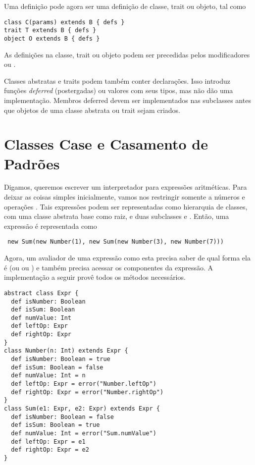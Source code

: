 Uma defini\c{c}\~{a}o pode agora ser uma defini\c{c}\~{a}o de classe, trait ou objeto, tal como  
\begin{lstlisting}
class C(params) extends B { defs }
trait T extends B { defs }
object O extends B { defs }
\end{lstlisting}
As defini\c{c}\~{o}es  na classe, trait ou objeto podem ser 
precedidas pelos modificadores  ou .


Classes abstratas e traits podem tamb\'{e}m conter declara\c{c}\~{o}es. Isso introduz
fun\c{c}\~{o}es {\em deferred} (postergadas) ou valores com seus tipos, mas n\~{a}o 
d\~{a}o uma implementa\c{c}\~{a}o. Membros deferred devem ser implementados nas subclasses 
antes que objetos de uma classe abstrata ou trait sejam criados. 

\chapter{Classes Case e Casamento de Padr\~{o}es}

Digamos, queremos escrever um interpretador para express\~{o}es aritm\'{e}ticas. Para 
deixar as coisas simples inicialmente, vamos nos restringir somente a n\'{u}meros e opera\c{c}\~{o}es \code{+}.
Tais express\~{o}es podem ser representadas como hierarquia de classes, 
com uma classe abstrata base  como raiz, e duas subclasses  e .
Ent\~{a}o, uma express\~{a}o  \'{e} representada como 
 \begin{lstlisting}
 new Sum(new Number(1), new Sum(new Number(3), new Number(7)))
 \end{lstlisting}

Agora, um avaliador de uma express\~{a}o como esta precisa saber de 
qual forma ela \'{e} (ou  ou ) e tamb\'{e}m precisa
acessar os componentes da express\~{a}o. A implementa\c{c}\~{a}o a seguir prov\^{e}
todos os m\'{e}todos necess\'{a}rios.
\begin{lstlisting}
abstract class Expr {
  def isNumber: Boolean
  def isSum: Boolean
  def numValue: Int
  def leftOp: Expr
  def rightOp: Expr
}
class Number(n: Int) extends Expr {
  def isNumber: Boolean = true
  def isSum: Boolean = false
  def numValue: Int = n
  def leftOp: Expr = error("Number.leftOp")
  def rightOp: Expr = error("Number.rightOp")
}
class Sum(e1: Expr, e2: Expr) extends Expr {
  def isNumber: Boolean = false
  def isSum: Boolean = true
  def numValue: Int = error("Sum.numValue")
  def leftOp: Expr = e1
  def rightOp: Expr = e2
}
\end{lstlisting}

